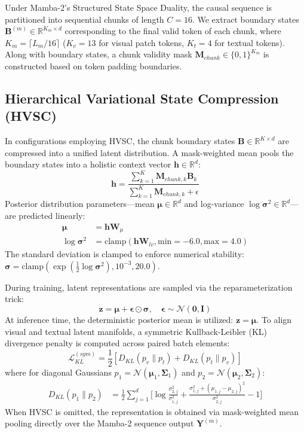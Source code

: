 \documentclass[journal]{IEEEtran}
\begin{document}
Under Mamba-2's Structured State Space Duality, the causal sequence is partitioned into sequential chunks of length $C = 16$. We extract boundary states $\mathbf{B}^{(m)} \in \mathbb{R}^{K_m \times d}$ corresponding to the final valid token of each chunk, where $K_m = \lceil L_m / 16 \rceil$ ($K_v = 13$ for visual patch tokens, $K_t = 4$ for textual tokens). Along with boundary states, a chunk validity mask $\mathbf{M}_{chunk} \in \{0, 1\}^{K_m}$ is constructed based on token padding boundaries.

\subsection{Hierarchical Variational State Compression (HVSC)}
In configurations employing HVSC, the chunk boundary states $\mathbf{B} \in \mathbb{R}^{K \times d}$ are compressed into a unified latent distribution. A mask-weighted mean pools the boundary states into a holistic context vector $\mathbf{h} \in \mathbb{R}^d$:
\begin{equation}
\mathbf{h} = \frac{\sum_{k=1}^K \mathbf{M}_{chunk, k} \mathbf{B}_k}{\sum_{k=1}^K \mathbf{M}_{chunk, k} + \epsilon}
\end{equation}
Posterior distribution parameters—mean $\boldsymbol{\mu} \in \mathbb{R}^d$ and log-variance $\log \boldsymbol{\sigma}^2 \in \mathbb{R}^d$—are predicted linearly:
\begin{align}
\boldsymbol{\mu} &= \mathbf{h} \mathbf{W}_\mu \\
\log \boldsymbol{\sigma}^2 &= \text{clamp}(\mathbf{h} \mathbf{W}_{lv}, \text{min}=-6.0, \text{max}=4.0)
\end{align}
The standard deviation is clamped to enforce numerical stability: $\boldsymbol{\sigma} = \text{clamp}(\exp(\frac{1}{2} \log \boldsymbol{\sigma}^2), 10^{-3}, 20.0)$.

During training, latent representations are sampled via the reparameterization trick:
\begin{equation}
\mathbf{z} = \boldsymbol{\mu} + \boldsymbol{\epsilon} \odot \boldsymbol{\sigma}, \quad \boldsymbol{\epsilon} \sim \mathcal{N}(\mathbf{0}, \mathbf{I})
\end{equation}
At inference time, the deterministic posterior mean is utilized: $\mathbf{z} = \boldsymbol{\mu}$. To align visual and textual latent manifolds, a symmetric Kullback-Leibler (KL) divergence penalty is computed across paired batch elements:
\begin{equation}
\mathcal{L}_{KL}^{(sym)} = \frac{1}{2} \left[ D_{KL}(p_v \parallel p_t) + D_{KL}(p_t \parallel p_v) \right]
\end{equation}
where for diagonal Gaussians $p_1 = \mathcal{N}(\boldsymbol{\mu}_1, \boldsymbol{\Sigma}_1)$ and $p_2 = \mathcal{N}(\boldsymbol{\mu}_2, \boldsymbol{\Sigma}_2)$:
\begin{align}
D_{KL}(p_1 \parallel p_2) &= \frac{1}{2} \sum_{j=1}^d \Bigg[ \log \frac{\sigma_{2,j}^2}{\sigma_{1,j}^2} + \frac{\sigma_{1,j}^2 + (\mu_{1,j} - \mu_{2,j})^2}{\sigma_{2,j}^2} - 1 \Bigg]
\end{align}
When HVSC is omitted, the representation is obtained via mask-weighted mean pooling directly over the Mamba-2 sequence output $\mathbf{Y}^{(m)}$.
\end{document}
